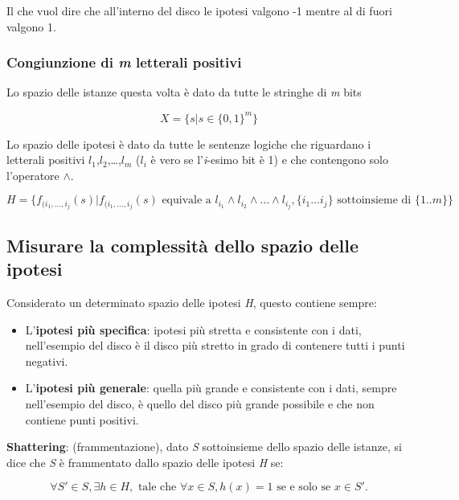 Il che vuol dire che all'interno del disco le ipotesi valgono -1 mentre
al di fuori valgono 1.

\subsubsection{\texorpdfstring{Congiunzione di \emph{m} letterali positivi}{Congiunzione di m letterali positivi}}\label{congiunzione-di-m-letterali-positivi}

Lo spazio delle istanze questa volta è dato da tutte le stringhe di \emph{m} bits

$$
X = \{s | s \in \{0,1\}^m\}
$$

Lo spazio delle ipotesi è dato da tutte le sentenze logiche che
riguardano i letterali positivi $l_1$,$l_2$,\ldots{},$l_m$ ($l_i$ è vero se
l'\emph{i}-esimo bit è 1) e che contengono solo l'operatore $\wedge$.

$$
H = \{ f_{(i_1,\ldots,i_j}(s) | f_{(i_1,\ldots,i_j}(s) \text{ equivale a } l_{i_1} \wedge l_{i_2} \wedge \ldots \wedge l_{i_j}, \{i_1\ldots{}i_j\} \text{ sottoinsieme di }  \{1..m\}\}
$$

\subsection{Misurare la complessità dello spazio delle ipotesi}\label{misurare-la-complessituxe0-dello-spazio-delle-ipotesi}

Considerato un determinato spazio delle ipotesi \emph{H}, questo
contiene sempre:

\begin{itemize}
\tightlist
\item
  L'\textbf{ipotesi più specifica}: ipotesi più stretta e consistente con
  i dati, nell'esempio del disco è il disco più stretto in grado di
  contenere tutti i punti negativi.
\item
  L'\textbf{ipotesi più generale}: quella più grande e consistente con i
  dati, sempre nell'esempio del disco, è quello del disco più grande
  possibile e che non contiene punti positivi.
\end{itemize}

\textbf{Shattering}: (frammentazione), dato \emph{S} sottoinsieme dello
spazio delle istanze, si dice che \emph{S} è frammentato dallo spazio
delle ipotesi \emph{H} se:

$$ 
\forall S' \in S, \exists h \in H, \text{ tale che } \forall x \in S, h(x) = 1 \text{ se e solo se } x \in S'.
$$


